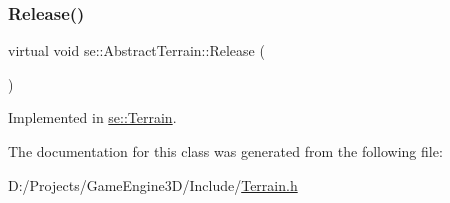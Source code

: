 \mbox{\label{classse_1_1_abstract_terrain_aeee5b6c81be6aee211819b8d79718bf5}} 
\subsubsection{\texorpdfstring{Release()}{Release()}}
{\footnotesize\ttfamily virtual void se\+::\+Abstract\+Terrain\+::\+Release (\begin{DoxyParamCaption}{ }\end{DoxyParamCaption})\hspace{0.3cm}{\ttfamily [pure virtual]}}



Implemented in \mbox{\hyperlink{classse_1_1_terrain_a61004e3426795d93190fe8d1f4159759}{se\+::\+Terrain}}.



The documentation for this class was generated from the following file\+:\begin{DoxyCompactItemize}
\item 
D\+:/\+Projects/\+Game\+Engine3\+D/\+Include/\mbox{\hyperlink{_terrain_8h}{Terrain.\+h}}\end{DoxyCompactItemize}
